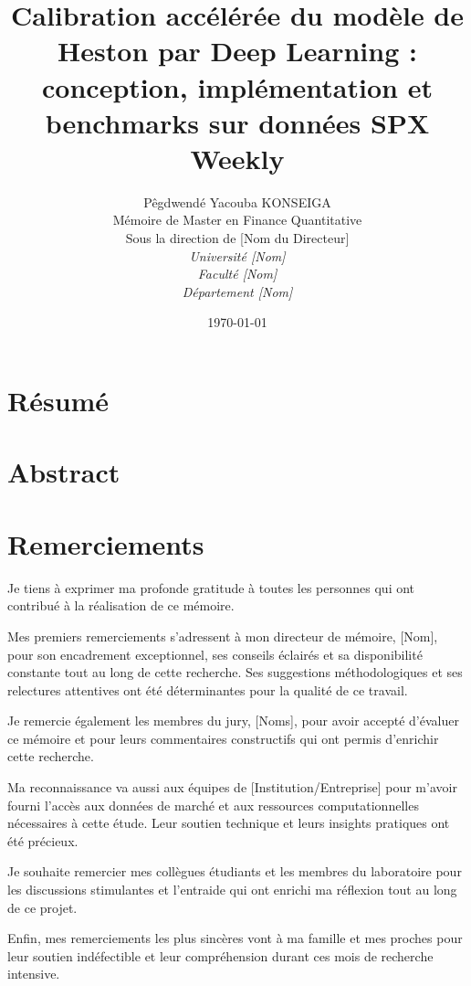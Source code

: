 \documentclass[12pt,a4paper,oneside]{report}
\title{
    \Large \textbf{Calibration accélérée du modèle de Heston par Deep Learning : conception, implémentation et benchmarks sur données SPX Weekly}
}
\author{
    Pêgdwendé Yacouba KONSEIGA\\[0.5cm]
    Mémoire de Master en Finance Quantitative\\[0.3cm]
    Sous la direction de [Nom du Directeur]\\[0.5cm]
    \textit{Université [Nom]}\\
    \textit{Faculté [Nom]}\\
    \textit{Département [Nom]}
}
\date{\today}
\begin{document}
\maketitle

\newpage
\thispagestyle{empty}
\mbox{}

\newpage
\chapter*{Résumé}


\newpage
\chapter*{Abstract}


\newpage
\chapter*{Remerciements}

Je tiens à exprimer ma profonde gratitude à toutes les personnes qui ont contribué à la réalisation de ce mémoire.

Mes premiers remerciements s'adressent à mon directeur de mémoire, [Nom], pour son encadrement exceptionnel, ses conseils éclairés et sa disponibilité constante tout au long de cette recherche. Ses suggestions méthodologiques et ses relectures attentives ont été déterminantes pour la qualité de ce travail.

Je remercie également les membres du jury, [Noms], pour avoir accepté d'évaluer ce mémoire et pour leurs commentaires constructifs qui ont permis d'enrichir cette recherche.

Ma reconnaissance va aussi aux équipes de [Institution/Entreprise] pour m'avoir fourni l'accès aux données de marché et aux ressources computationnelles nécessaires à cette étude. Leur soutien technique et leurs insights pratiques ont été précieux.

Je souhaite remercier mes collègues étudiants et les membres du laboratoire pour les discussions stimulantes et l'entraide qui ont enrichi ma réflexion tout au long de ce projet.

Enfin, mes remerciements les plus sincères vont à ma famille et mes proches pour leur soutien indéfectible et leur compréhension durant ces mois de recherche intensive.
\end{document}
